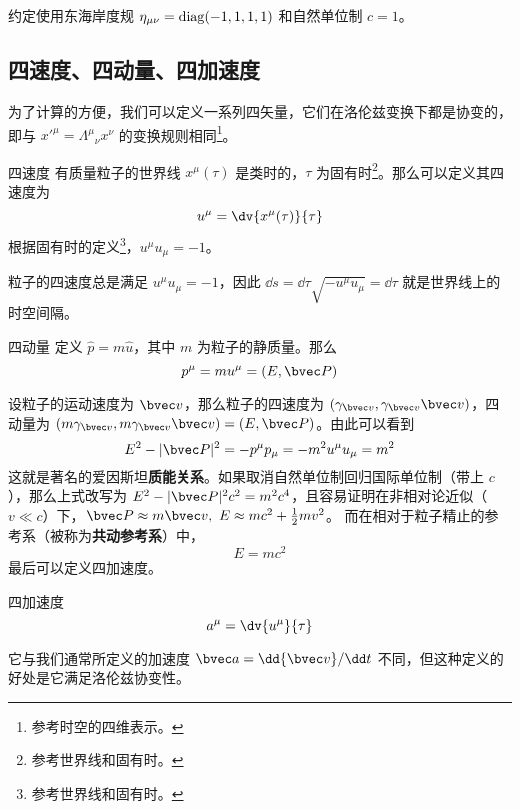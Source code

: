 

约定使用东海岸度规 $\eta_{\mu\nu}=\rm{diag}(-1,1,1,1)$ 和自然单位制 $c=1$。

\subsection{四速度、四动量、四加速度}
为了计算的方便，我们可以定义一系列四矢量，它们在洛伦兹变换下都是协变的，即与 $x'^\mu=\Lambda^\mu{}_\nu x^\nu$ 的变换规则相同\footnote{参考时空的四维表示。}。

\begin{definition}{四速度}
有质量粒子的世界线 $x^\mu(\tau)$ 是类时的，$\tau$ 为固有时\footnote{参考世界线和固有时。}。那么可以定义其四速度为
\begin{equation}
u^\mu = \dv{x^\mu(\tau)}{\tau}
\end{equation}
根据固有时的定义\footnote{参考世界线和固有时。}，$u^\mu u_\mu = -1$。
\end{definition}
粒子的四速度总是满足 $u^\mu u_\mu = -1$，因此 $\dd s = \dd \tau \sqrt{- u^\mu u_\mu} = \dd \tau$ 就是世界线上的时空间隔。

\begin{definition}{四动量}
定义 $\hat p=m\hat u$，其中 $m$ 为粒子的静质量。那么
\begin{equation}
p^\mu = m u^\mu = (E,\bvec P)
\end{equation}
\end{definition}
设粒子的运动速度为 $\bvec v$，那么粒子的四速度为 $(\gamma_{\bvec v},\gamma_{\bvec v}\bvec v)$，四动量为 $(m\gamma_{\bvec v}, m\gamma_{\bvec v} \bvec v)=(E,\bvec P)$。由此可以看到
\begin{equation}
E^2-|\bvec P|^2=-p^\mu p_\mu=-m^2 u^\mu u_\mu = m^2
\end{equation}
这就是著名的爱因斯坦\textbf{质能关系}。如果取消自然单位制回归国际单位制（带上 $c$），那么上式改写为 $E^2-|\bvec P|^2c^2=m^2c^4$，且容易证明在非相对论近似（$v\ll c$）下，$\bvec P\approx m\bvec v,\ E\approx mc^2+\frac{1}{2}mv^2$。
而在相对于粒子精止的参考系（被称为\textbf{共动参考系}）中，
\begin{equation}
E=mc^2
\end{equation}
最后可以定义四加速度。
\begin{definition}{四加速度}
\begin{equation}
a^\mu = \dv{u^\mu}{\tau}
\end{equation}
\end{definition}
它与我们通常所定义的加速度 $\bvec a=\dd {\bvec v}/\dd t$ 不同，但这种定义的好处是它满足洛伦兹协变性。